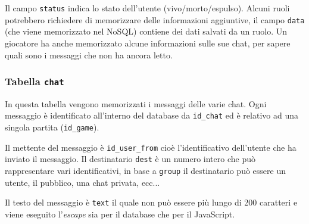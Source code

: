 Il campo \texttt{status} indica lo stato dell'utente (vivo/morto/espulso). Alcuni ruoli potrebbero richiedere di memorizzare delle informazioni aggiuntive, il campo \texttt{data} (che viene memorizzato nel NoSQL) contiene dei dati salvati da un ruolo. Un giocatore ha anche memorizzato alcune informazioni sulle sue chat, per sapere quali sono i messaggi che non ha ancora letto.



\subsubsection{Tabella \texttt{chat}}

In questa tabella vengono memorizzati i messaggi delle varie chat. Ogni messaggio è identificato all'interno del database da \texttt{id\_chat} ed è relativo ad una singola partita (\texttt{id\_game}).

Il mettente del messaggio è \texttt{id\_user\_from} cioè l'identificativo dell'utente che ha inviato il messaggio. Il destinatario \texttt{dest} è un numero intero che può rappresentare vari identificativi, in base a \texttt{group} il destinatario può essere un utente, il pubblico, una chat privata, ecc...

Il testo del messaggio è \texttt{text} il quale non può essere più lungo di 200 caratteri e viene eseguito l'\emph{escape} sia per il database che per il JavaScript.

\newpage



